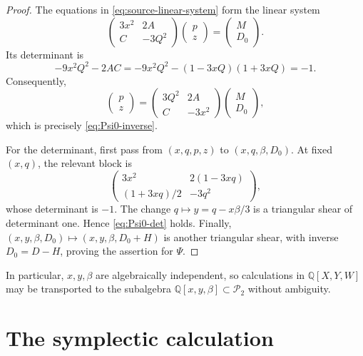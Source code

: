 \documentclass[11pt]{article}
\newcommand{\Q}{\mathbb Q}
\newcommand{\Pcal}{\mathcal P}
\theoremstyle{remark}
\begin{document}
\begin{proof}
The equations in \eqref{eq:source-linear-system} form the linear system
\[
  \begin{pmatrix}
    3x^2&2A\\
    C&-3Q^2
  \end{pmatrix}
  \begin{pmatrix}p\\z\end{pmatrix}
  =
  \begin{pmatrix}M\\D_0\end{pmatrix}.
\]
Its determinant is
\[
  -9x^2Q^2-2AC
  =-9x^2Q^2-(1-3xQ)(1+3xQ)
  =-1.
\]
Consequently,
\[
  \begin{pmatrix}p\\z\end{pmatrix}
  =
  \begin{pmatrix}
    3Q^2&2A\\
    C&-3x^2
  \end{pmatrix}
  \begin{pmatrix}M\\D_0\end{pmatrix},
\]
which is precisely \eqref{eq:Psi0-inverse}.

For the determinant, first pass from \((x,q,p,z)\) to
\((x,q,\beta,D_0)\).  At fixed \((x,q)\), the relevant block is
\[
  \begin{pmatrix}
    3x^2&2(1-3xq)\\[2pt]
    (1+3xq)/2&-3q^2
  \end{pmatrix},
\]
whose determinant is \(-1\).  The change
\(q\mapsto y=q-x\beta/3\) is a triangular shear of determinant one.  Hence
\eqref{eq:Psi0-det} holds.  Finally,
\((x,y,\beta,D_0)\mapsto(x,y,\beta,D_0+H)\) is another triangular shear,
with inverse \(D_0=D-H\), proving the assertion for \(\Psi\).
\end{proof}

In particular, \(x,y,\beta\) are algebraically independent, so calculations
in \(\Q[X,Y,W]\) may be transported to the subalgebra
\(\Q[x,y,\beta]\subset\Pcal_2\) without ambiguity.

\section{The symplectic calculation}\label{sec:symplectic-calculation}
\end{document}
